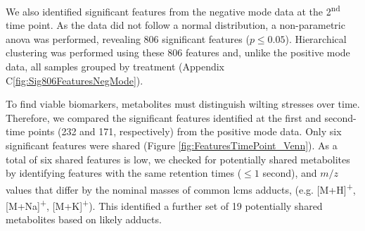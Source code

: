 We also identified significant features from the negative mode data at the 2\textsuperscript{nd} time point. As the data did not follow a normal distribution, a non-parametric \ac{anova} was performed, revealing 806 significant features ($p\le0.05$). Hierarchical clustering was performed using these 806 features and, unlike the positive mode data, all samples grouped by treatment (Appendix C\ref{fig:Sig806FeaturesNegMode}). 

\label{section:T1AndT2Adducts}
To find viable biomarkers, metabolites must distinguish wilting stresses over time. Therefore, we compared the significant features identified at the first and second-time points (232 and 171, respectively) from the positive mode data. Only six significant features were shared (Figure \ref{fig:FeaturesTimePoint_Venn}). As a total of six shared features is low, we checked for potentially shared metabolites by identifying features with the same retention times ($\le1$ second), and $m/z$ values that differ by the nominal masses of common \ac{lcms} adducts, (e.g. [M+H]\textsuperscript{+}, [M+Na]\textsuperscript{+}, [M+K]\textsuperscript{+}). This identified a further set of 19 potentially shared metabolites based on likely adducts. 

